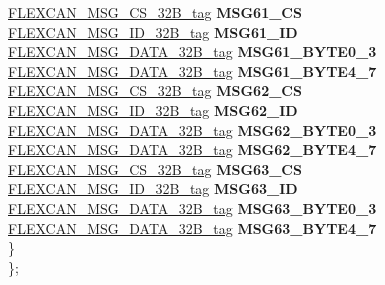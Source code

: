 \begin{DoxyCompactItemize}
\begin{tabbing}
\>\>\mbox{\hyperlink{unionFLEXCAN__MSG__CS__32B__tag}{FLEXCAN\_MSG\_CS\_32B\_tag}} {\bfseries MSG61\_CS}\\
\>\>\mbox{\hyperlink{unionFLEXCAN__MSG__ID__32B__tag}{FLEXCAN\_MSG\_ID\_32B\_tag}} {\bfseries MSG61\_ID}\\
\>\>\mbox{\hyperlink{unionFLEXCAN__MSG__DATA__32B__tag}{FLEXCAN\_MSG\_DATA\_32B\_tag}} {\bfseries MSG61\_BYTE0\_3}\\
\>\>\mbox{\hyperlink{unionFLEXCAN__MSG__DATA__32B__tag}{FLEXCAN\_MSG\_DATA\_32B\_tag}} {\bfseries MSG61\_BYTE4\_7}\\
\>\>\mbox{\hyperlink{unionFLEXCAN__MSG__CS__32B__tag}{FLEXCAN\_MSG\_CS\_32B\_tag}} {\bfseries MSG62\_CS}\\
\>\>\mbox{\hyperlink{unionFLEXCAN__MSG__ID__32B__tag}{FLEXCAN\_MSG\_ID\_32B\_tag}} {\bfseries MSG62\_ID}\\
\>\>\mbox{\hyperlink{unionFLEXCAN__MSG__DATA__32B__tag}{FLEXCAN\_MSG\_DATA\_32B\_tag}} {\bfseries MSG62\_BYTE0\_3}\\
\>\>\mbox{\hyperlink{unionFLEXCAN__MSG__DATA__32B__tag}{FLEXCAN\_MSG\_DATA\_32B\_tag}} {\bfseries MSG62\_BYTE4\_7}\\
\>\>\mbox{\hyperlink{unionFLEXCAN__MSG__CS__32B__tag}{FLEXCAN\_MSG\_CS\_32B\_tag}} {\bfseries MSG63\_CS}\\
\>\>\mbox{\hyperlink{unionFLEXCAN__MSG__ID__32B__tag}{FLEXCAN\_MSG\_ID\_32B\_tag}} {\bfseries MSG63\_ID}\\
\>\>\mbox{\hyperlink{unionFLEXCAN__MSG__DATA__32B__tag}{FLEXCAN\_MSG\_DATA\_32B\_tag}} {\bfseries MSG63\_BYTE0\_3}\\
\>\>\mbox{\hyperlink{unionFLEXCAN__MSG__DATA__32B__tag}{FLEXCAN\_MSG\_DATA\_32B\_tag}} {\bfseries MSG63\_BYTE4\_7}\\
\>\} \\
\}; \\


\end{tabbing}
\end{DoxyCompactItemize}
